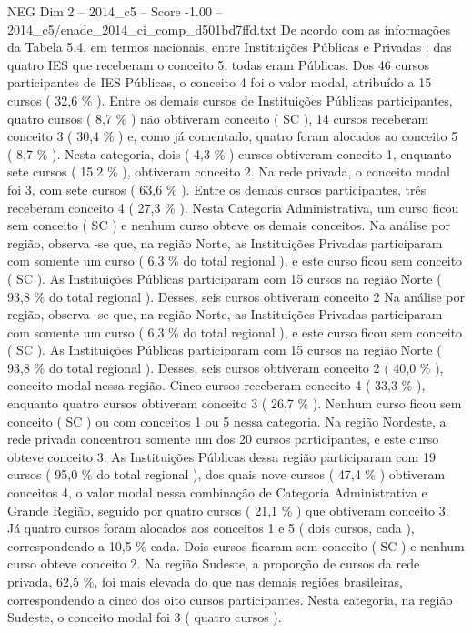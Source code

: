 \begin{textsample}{NEG Dim 2 – 2014\_c5 – Score -1.00 – 2014\_c5/enade\_2014\_ci\_comp\_d501bd7ffd.txt}
De acordo com as informações da Tabela 5.4, em termos nacionais, entre Instituições Públicas e Privadas : das quatro IES que receberam o conceito 5, todas eram Públicas.
Dos 46 cursos participantes de IES Públicas, o conceito 4 foi o valor modal, atribuído a 15 cursos ( 32,6 \% ).
Entre os demais cursos de Instituições Públicas participantes, quatro cursos ( 8,7 \% ) não obtiveram conceito ( SC ), 14 cursos receberam conceito 3 ( 30,4 \% ) e, como já comentado, quatro foram alocados ao conceito 5 ( 8,7 \% ).
Nesta categoria, dois ( 4,3 \% ) cursos obtiveram conceito 1, enquanto sete cursos ( 15,2 \% ), obtiveram conceito 2.
Na rede privada, o conceito modal foi 3, com sete cursos ( 63,6 \% ).
Entre os demais cursos participantes, três receberam conceito 4 ( 27,3 \% ).
Nesta Categoria Administrativa, um curso ficou sem conceito ( SC ) e nenhum curso obteve os demais conceitos.
Na análise por região, observa -se que, na região Norte, as Instituições Privadas participaram com somente um curso ( 6,3 \% do total regional ), e este curso ficou sem conceito ( SC ).
As Instituições Públicas participaram com 15 cursos na região Norte ( 93,8 \% do total regional ).
Desses, seis cursos obtiveram conceito 2 Na análise por região, observa -se que, na região Norte, as Instituições Privadas participaram com somente um curso ( 6,3 \% do total regional ), e este curso ficou sem conceito ( SC ).
As Instituições Públicas participaram com 15 cursos na região Norte ( 93,8 \% do total regional ).
Desses, seis cursos obtiveram conceito 2 ( 40,0 \% ), conceito modal nessa região.
Cinco cursos receberam conceito 4 ( 33,3 \% ), enquanto quatro cursos obtiveram conceito 3 ( 26,7 \% ).
Nenhum curso ficou sem conceito ( SC ) ou com conceitos 1 ou 5 nessa categoria.
Na região Nordeste, a rede privada concentrou somente um dos 20 cursos participantes, e este curso obteve conceito 3.
As Instituições Públicas dessa região participaram com 19 cursos ( 95,0 \% do total regional ), dos quais nove cursos ( 47,4 \% ) obtiveram conceitos 4, o valor modal nessa combinação de Categoria Administrativa e Grande Região, seguido por quatro cursos ( 21,1 \% ) que obtiveram conceito 3.
Já quatro cursos foram alocados aos conceitos 1 e 5 ( dois cursos, cada ), correspondendo a 10,5 \% cada.
Dois cursos ficaram sem conceito ( SC ) e nenhum curso obteve conceito 2.
Na região Sudeste, a proporção de cursos da rede privada, 62,5 \%, foi mais elevada do que nas demais regiões brasileiras, correspondendo a cinco dos oito cursos participantes.
Nesta categoria, na região Sudeste, o conceito modal foi 3 ( quatro cursos ).

\end{textsample}
